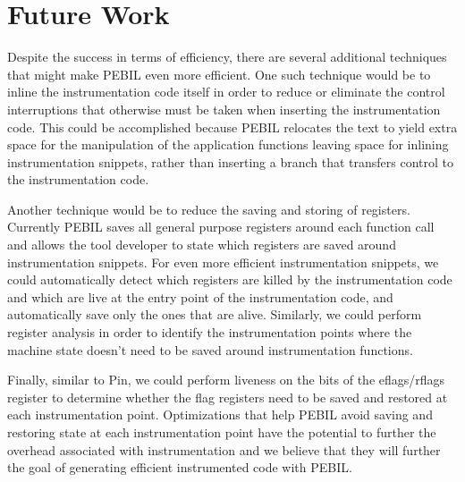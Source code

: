 \section{Future Work}
\label{sec:Future}

Despite the success in terms of efficiency, there are several additional
techniques that might make PEBIL even more efficient. One such technique would be
to inline the instrumentation code itself in order to reduce or eliminate the
control interruptions  that otherwise must be taken when inserting the
instrumentation code. This could be accomplished because PEBIL relocates the
text to yield extra space for the manipulation of the application functions
leaving space for inlining instrumentation snippets, rather than 
inserting a branch that transfers control to the instrumentation code. 

Another technique would be to reduce the saving and storing of registers.
Currently PEBIL saves all general purpose registers around each function call
and allows the tool developer to state which registers are saved around
instrumentation snippets. For even more efficient instrumentation snippets, we
could automatically detect which registers are killed by the instrumentation
code and which are live at the entry point of the instrumentation code, and
automatically save only the ones that are alive. Similarly, we could perform
register analysis in order to identify the instrumentation points where the
machine state doesn't need to be saved around instrumentation functions. 

Finally, similar to Pin, we could perform liveness on the bits of the
eflags/rflags register to determine whether the flag registers need to be saved
and restored at each instrumentation point. Optimizations that help PEBIL avoid
saving and restoring state at each instrumentation point have the potential to
further the overhead associated with instrumentation and we believe that they
will further the goal of generating efficient instrumented code with PEBIL.


